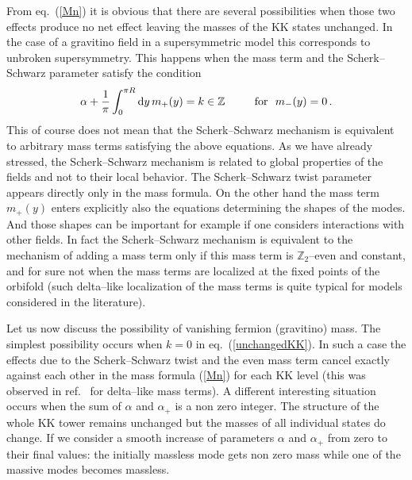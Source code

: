 \documentclass[a4paper,12pt]{article}
\def\al{\alpha}
\def\d{{\rm d}}
\def\ZZ{\mathbb Z}
\begin{document}
From eq.\ (\ref{Mn}) it is obvious that there are several
possibilities when those two effects produce no net effect leaving the
masses of the KK states unchanged. In the case of a 
gravitino field in a supersymmetric model this corresponds to unbroken
supersymmetry. This happens when the mass term and the
Scherk--Schwarz parameter satisfy the condition
\begin{equation}
\al+\frac{1}{\pi}\int_0^{\pi R}\d y\,m_+(y) 
=
k \in \ZZ
\qquad {\rm\ \ for\ \ }m_-(y)=0
\,.
\label{unchangedKK}
\end{equation}
This of course does not mean that the Scherk--Schwarz mechanism
is equivalent to arbitrary mass terms satisfying the above equations. 
As we have already stressed, the Scherk--Schwarz mechanism is related
to global properties of the fields and not to their local behavior. 
The Scherk--Schwarz twist parameter appears directly only in the mass
formula. On the other hand the mass term $m_+(y)$ enters explicitly
also the equations determining the shapes of the modes. And those
shapes can be important for example if one considers interactions with
other fields. In fact the Scherk--Schwarz mechanism is equivalent to
the mechanism of adding a mass term only if this mass term is
$\ZZ_2$--even and constant, and for sure 
not when the mass terms are localized at the fixed points of the
orbifold (such delta--like localization of the mass terms is quite
typical for models considered in the literature).  


Let us now discuss the possibility of vanishing fermion (gravitino)
mass. The simplest possibility occurs when $k=0$ in eq.\
(\ref{unchangedKK}). In such a case the effects due to the
Scherk--Schwarz twist and the even mass term cancel exactly against
each other in the mass formula (\ref{Mn}) for each KK 
level (this was observed in ref.\ \cite{Bagger:2001qi} for 
delta--like mass terms). A different
interesting situation occurs when the sum of $\al$ and $\al_+$ is a
non zero integer. The structure of the whole KK tower remains
unchanged but the masses of all individual states do change. If we
consider a smooth increase of parameters $\al$ and $\al_+$ from zero
to their final values: the initially massless mode gets non zero mass
while one of the massive modes becomes massless.
\end{document}
